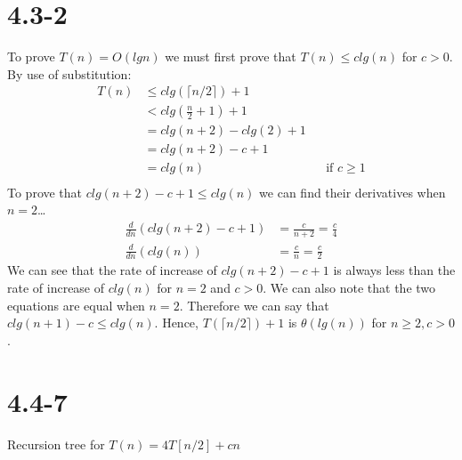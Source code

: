 \documentclass{article}
\begin{document}
{\section{4.3-2}
To prove $T(n) = O(lgn)$ we must first prove that $T(n) \leq clg(n)$ for $c > 0$.
By use of substitution: \\
\begin{align*}
  T(n) &\leq clg(\lceil n/2 \rceil) + 1 \\
       &< clg(\frac{n}{2} + 1) + 1 \\
       &= clg(n + 2) - clg(2) + 1 \\
       &= clg(n + 2) - c + 1 \\
       &= clg(n) && \text{if $c \geq 1$} \\
\end{align*}
To prove that $clg(n + 2) - c + 1 \leq clg(n)$ we can find their
  derivatives when $n = 2$\ldots
\begin{align*}
  \frac{d}{dn}(clg(n + 2) - c + 1) &= \frac{c}{n+2} = \frac{c}{4}\\
  \frac{d}{dn}(clg(n)) &= \frac{c}{n} = \frac{c}{2}
\end{align*}
We can see that the rate of increase of $clg(n+2)-c+1$ is always
  less than the rate of increase of $clg(n)$ for $n = 2$
  and $c > 0$. We can also note that the two equations are equal
  when $n = 2$. Therefore we can say that $clg(n + 1) - c \leq clg(n)$.
  Hence, $T(\lceil n/2 \rceil) + 1$ is $\theta(lg(n))$ for
  $n \geq 2, c > 0$.

\section{4.4-7}
\begin{centering}
Recursion tree for $T(n) = 4T[n/2]  + cn$ \\
\end{centering}
\resizebox{0.9\textwidth}{!}{
\Tree [.$cn$ [.$c(n/2)$ $T(n/4)$ $T(n/4)$ $T(n/4)$ $T(n/4)$ ] [.$c(n/2)$ $T(n/4)$ $T(n/4)$ $T(n/4)$ $T(n/4)$ ] [.$c(n/2)$ $T(n/4)$ $T(n/4)$ $T(n/4)$ $T(n/4)$ ] [.$c(n/2)$ $T(n/4)$ $T(n/4)$ $T(n/4)$ $T(n/4)$ ] ]
} \\ \\

}
\end{document}
